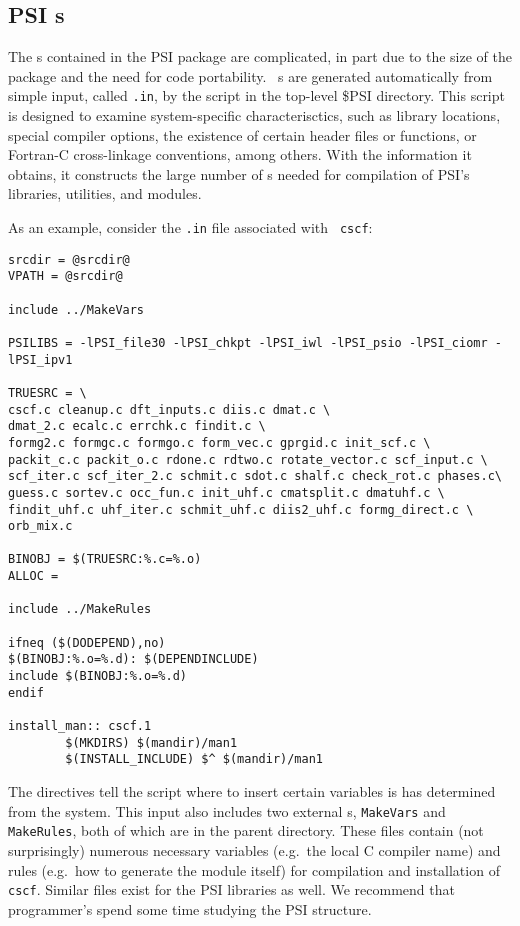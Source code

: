 \subsection{PSI s}
The s contained in the PSI package are complicated, in
part due to the size of the package and the need for code portability.
\PSIthree\ s are generated automatically from simple
input, called {\tt {}.in}, by the  script
in the top-level \$PSI directory.  This script is designed to examine
system-specific characterisctics, such as library locations, special
compiler options, the existence of certain header files or functions,
or Fortran-C cross-linkage conventions, among others.  With the
information it obtains, it constructs the large number of
s needed for compilation of PSI's libraries, utilities,
and modules.

As an example, consider the {\tt {}.in} file associated with {\tt
cscf}:
\begin{verbatim}
srcdir = @srcdir@
VPATH = @srcdir@

include ../MakeVars

PSILIBS = -lPSI_file30 -lPSI_chkpt -lPSI_iwl -lPSI_psio -lPSI_ciomr -lPSI_ipv1

TRUESRC = \
cscf.c cleanup.c dft_inputs.c diis.c dmat.c \
dmat_2.c ecalc.c errchk.c findit.c \
formg2.c formgc.c formgo.c form_vec.c gprgid.c init_scf.c \
packit_c.c packit_o.c rdone.c rdtwo.c rotate_vector.c scf_input.c \
scf_iter.c scf_iter_2.c schmit.c sdot.c shalf.c check_rot.c phases.c\
guess.c sortev.c occ_fun.c init_uhf.c cmatsplit.c dmatuhf.c \
findit_uhf.c uhf_iter.c schmit_uhf.c diis2_uhf.c formg_direct.c \
orb_mix.c

BINOBJ = $(TRUESRC:%.c=%.o)
ALLOC =

include ../MakeRules

ifneq ($(DODEPEND),no)
$(BINOBJ:%.o=%.d): $(DEPENDINCLUDE)
include $(BINOBJ:%.o=%.d)
endif

install_man:: cscf.1
        $(MKDIRS) $(mandir)/man1
      	$(INSTALL_INCLUDE) $^ $(mandir)/man1
\end{verbatim}

The
 directives tell the  script where to insert certain
variables is has determined from the system.  This 
input also includes two external s, {\tt MakeVars} and
{\tt MakeRules}, both of which are in the parent directory.  These
files contain (not surprisingly) numerous necessary variables
(e.g.~the local C compiler name) and rules (e.g.~how to generate the
module itself) for compilation and installation of {\tt cscf}.
Similar files exist for the PSI libraries as well.  We recommend that
programmer's spend some time studying the PSI \file{Makefile}
structure.

